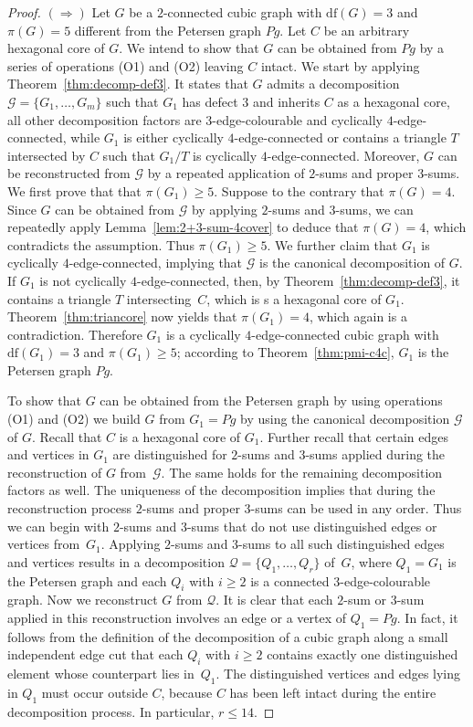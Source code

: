 \documentclass[a4paper]{amsart}
\newcommand{\df}[1]{\ensuremath{\mathrm{df}({#1})}\xspace}
\theoremstyle{plain}
\theoremstyle{definition}
\begin{document}
\begin{proof}
$(\Rightarrow)$ Let $G$ be a $2$-connected cubic graph with
$\df{G}=3$ and $\pi(G)=5$ different from the Petersen graph
$Pg$. Let $C$ be an arbitrary hexagonal core of $G$. We intend
to show that $G$ can be obtained from $Pg$ by a series of
operations (O1) and (O2) leaving $C$ intact.  We start by
applying Theorem~\ref{thm:decomp-def3}. It states that $G$
admits a decomposition $\mathcal{G}=\{G_1,\ldots,G_m\}$ such
that $G_1$ has defect $3$ and inherits $C$ as a hexagonal core,
all other decomposition factors are $3$-edge-colourable and
cyclically $4$-edge-connected, while $G_1$ is either cyclically
$4$-edge-connected or contains a triangle $T$ intersected by
$C$ such that $G_1/T$ is cyclically $4$-edge-connected.
Moreover, $G$ can be reconstructed from $\mathcal{G}$ by a
repeated application of $2$-sums and proper $3$-sums. We first
prove that that $\pi(G_1)\ge 5$. Suppose to the contrary that
$\pi(G)=4$. Since $G$ can be obtained from $\mathcal{G}$ by
applying $2$-sums and $3$-sums, we can repeatedly apply
Lemma~\ref{lem:2+3-sum-4cover} to deduce that $\pi(G)=4$, which
contradicts the assumption. Thus $\pi(G_1)\ge 5$. 
We further claim that $G_1$ is
cyclically $4$-edge-connected, implying that $\mathcal{G}$ is
the canonical decomposition of $G$. If $G_1$ is not cyclically
$4$-edge-connected, then, by Theorem~\ref{thm:decomp-def3}, it
contains a triangle $T$ intersecting~$C$, which is s a
hexagonal core of $G_1$. Theorem~\ref{thm:triancore} now yields
that $\pi(G_1)=4$, which again is a contradiction. Therefore
$G_1$ is a cyclically $4$-edge-connected cubic graph with
$\df{G_1}=3$ and $\pi(G_1)\ge 5$; according to
Theorem~\ref{thm:pmi-c4c}, $G_1$ is the Petersen graph $Pg$.

To show that $G$ can be obtained from the Petersen graph by
using operations (O1) and (O2) we build $G$ from $G_1=Pg$ by
using the canonical decomposition $\mathcal{G}$ of $G$. Recall
that $C$ is a hexagonal core of $G_1$. Further recall that
certain edges and vertices in $G_1$ are distinguished for
$2$-sums and $3$-sums applied during the reconstruction of $G$
from~$\mathcal{G}$. The same holds for the remaining
decomposition factors as well. The uniqueness of the
decomposition implies that during the reconstruction process
$2$-sums and proper $3$-sums can be used in any order. Thus we
can begin with $2$-sums and $3$-sums that do not use
distinguished edges or vertices from~$G_1$. Applying $2$-sums
and $3$-sums to all such distinguished edges and vertices
results in a decomposition $\mathcal{Q}=\{Q_1,\ldots, Q_r\}$
of~$G$, where $Q_1=G_1$ is the Petersen graph and each $Q_i$
with $i\ge 2$ is a connected $3$-edge-colourable graph. Now we
reconstruct $G$ from $\mathcal{Q}$. It is clear that each
$2$-sum or $3$-sum applied in this reconstruction involves an
edge or a vertex of $Q_1=Pg$. In fact, it follows from the
definition of the decomposition of a cubic graph along a small
independent edge cut that each $Q_i$ with $i\ge 2$ contains
exactly one distinguished element whose counterpart lies
in~$Q_1$. The distinguished vertices and edges lying in $Q_1$
must occur outside $C$, because $C$ has been left intact during
the entire decomposition process. In particular, $r\le 14$.


\end{proof}
\end{document}
